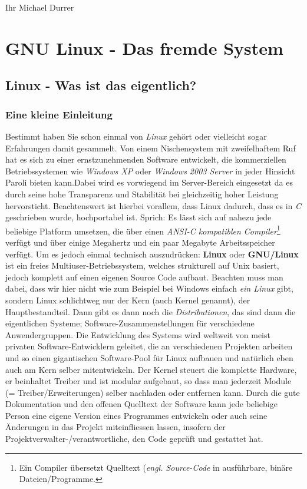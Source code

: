 \documentclass[b5paper,10pt,dvips,fleqn,titlepage,twoside]{book}
\begin{document}
Ihr Michael Durrer
\newpage
\part{GNU Linux - Das fremde System}

\chapter{Linux - Was ist das eigentlich?}
\section{Eine kleine Einleitung}
Bestimmt haben Sie schon einmal von \emph{Linux} gehört oder vielleicht sogar Erfahrungen damit gesammelt. Von einem Nischensystem mit zweifelhaftem Ruf hat es sich zu einer ernstzunehmenden Software entwickelt, die kommerziellen Betriebssystemen wie \emph{Windows XP} oder \emph{Windows 2003 Server} in jeder Hinsicht  Paroli bieten kann.\newline Dabei wird es vorwiegend im Server-Bereich eingesetzt da es durch seine hohe Transparenz und Stabilität bei gleichzeitig hoher Leistung hervorsticht. Beachtenswert ist hierbei vorallem, dass Linux dadurch, dass es in \emph{C} geschrieben wurde, hochportabel ist. Sprich: Es lässt sich auf nahezu jede beliebige Platform umsetzen, die über einen \emph{ANSI-C kompatiblen Compiler}\footnote{Ein Compiler übersetzt Quelltext (\textit{engl. Source-Code} in ausführbare, binäre Dateien/Programme.} verfügt und über einige Megahertz und ein paar Megabyte Arbeitsspeicher verfügt.\newline
Um es jedoch einmal technisch auszudrücken: \textbf{Linux} oder \textbf{GNU/Linux} ist ein freies Multiuser-Betriebssystem, welches strukturell auf Unix basiert, jedoch komplett auf einen eigenen Source Code aufbaut. Beachten muss man dabei, dass wir hier nicht wie zum Beispiel bei Windows einfach \emph{ein Linux} gibt, sondern Linux schlichtweg nur der Kern (auch Kernel genannt), der Hauptbestandteil. Dann gibt es dann noch die \emph{Distributionen}, das sind dann die eigentlichen Systeme; Software-Zusammenstellungen für verschiedene Anwendergruppen. Die Entwicklung des Systems wird weltweit von meist privaten Software-Entwicklern geleitet, die an verschiedenen Projekten arbeiten und so einen gigantischen Software-Pool für Linux aufbauen und natürlich eben auch am Kern selber mitentwickeln.
\newline
Der Kernel steuert die komplette Hardware, er beinhaltet Treiber und ist modular aufgebaut, so dass man jederzeit Module (= Treiber/Erweiterungen) selber nachladen oder entfernen kann. Durch die gute Dokumentation und den offenen Quelltext der Software kann jede beliebige Person eine eigene Version eines Programmes entwickeln oder auch seine Änderungen in das Projekt miteinfliessen lassen, insofern der Projektverwalter-/verantwortliche, den Code geprüft und gestattet hat.
\end{document}
